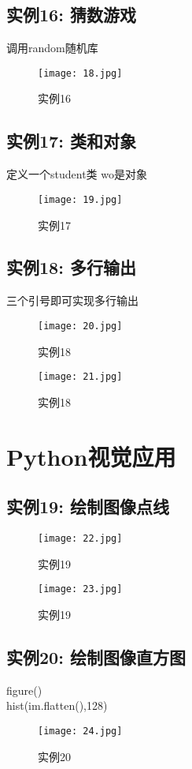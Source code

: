 \documentclass[a4paper, 12pt]{article}
\begin{document}
        \subsection{实例16: 猜数游戏}
        调用random随机库
        \begin{figure}[h!]
          \centering
          \texttt{[image: 18.jpg]}
          \caption{实例16}
        \end{figure}
       
        \subsection{实例17: 类和对象}
        定义一个student类 wo是对象
        \begin{figure}[h!]
          \centering
          \texttt{[image: 19.jpg]}
          \caption{实例17}
        \end{figure}
        \subsection{实例18: 多行输出}
        三个引号即可实现多行输出
        \begin{figure}[h!]
          \centering
          \texttt{[image: 20.jpg]}
          \caption{实例18}
        \end{figure}
        \begin{figure}[h!]
          \centering
          \texttt{[image: 21.jpg]}
          \caption{实例18}
        \end{figure}
        \newpage
        \section{Python视觉应用}
        \subsection{实例19: 绘制图像点线}
        \begin{figure}[h!]
          \centering
          \texttt{[image: 22.jpg]}
          \caption{实例19}
        \end{figure}
        \begin{figure}[h!]
          \centering
          \texttt{[image: 23.jpg]}
          \caption{实例19}
        \end{figure}
        \newpage
        \newpage
        \subsection{实例20: 绘制图像直方图}
        \noindent figure()\\
        hist(im.flatten(),128)
        \begin{figure}[h!]
          \centering
          \texttt{[image: 24.jpg]}
          \caption{实例20}
        \end{figure}
        \newpage
\end{document}
